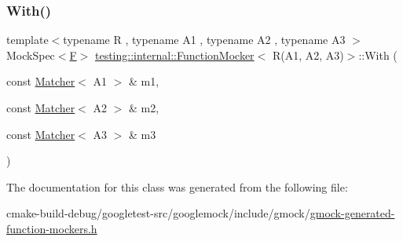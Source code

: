 \mbox{\label{classtesting_1_1internal_1_1FunctionMocker_3_01R_07A1_00_01A2_00_01A3_08_4_a06fc66e2e75ff98d257966e7234bb833}} 
\subsubsection{\texorpdfstring{With()}{With()}}
{\footnotesize\ttfamily template$<$typename R , typename A1 , typename A2 , typename A3 $>$ \\
Mock\+Spec$<$\mbox{\hyperlink{classtesting_1_1internal_1_1FunctionMocker_3_01R_07A1_00_01A2_00_01A3_08_4_a8c471830f963b8012785eb3eeca2cc9c}{F}}$>$ \mbox{\hyperlink{classtesting_1_1internal_1_1FunctionMocker}{testing\+::internal\+::\+Function\+Mocker}}$<$ R(A1, A2, A3)$>$\+::With (\begin{DoxyParamCaption}\item[{const \mbox{\hyperlink{classtesting_1_1Matcher}{Matcher}}$<$ A1 $>$ \&}]{m1,  }\item[{const \mbox{\hyperlink{classtesting_1_1Matcher}{Matcher}}$<$ A2 $>$ \&}]{m2,  }\item[{const \mbox{\hyperlink{classtesting_1_1Matcher}{Matcher}}$<$ A3 $>$ \&}]{m3 }\end{DoxyParamCaption})\hspace{0.3cm}{\ttfamily [inline]}}



The documentation for this class was generated from the following file\+:\begin{DoxyCompactItemize}
\item 
cmake-\/build-\/debug/googletest-\/src/googlemock/include/gmock/\mbox{\hyperlink{gmock-generated-function-mockers_8h}{gmock-\/generated-\/function-\/mockers.\+h}}\end{DoxyCompactItemize}
